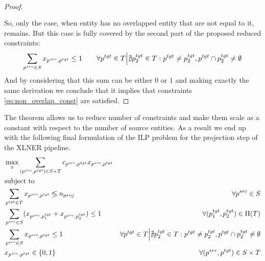 \begin{proof}
\begin{multline*}
\begin{aligned}
        \end{aligned}
    \end{multline*}
    So, only the case, when entity has no overlapped entity that are
    not equal to it, remains. But this case is fully covered by the second part of the proposed reduced constraints:
    \[
        \sum\limits_{p^{src} \in S} x_{p^{src}, p^{tgt}} \leq 1 \qquad
        \forall p^{tgt} \in T \Big| \nexists p_2^{tgt} \in T: p^{tgt} \neq p_2^{tgt}, p^{tgt} \cap p_2^{tgt} \neq \emptyset
    \]
    And by considering that this sum can be either \( 0 \) or \( 1 \) and making
    exactly the same derivation we conclude that it implies that
    constraints \eqref{eq:non_overlap_const} are satisfied.
\end{proof}

The theorem allows us to reduce number of constraints and make them scale as a constant
with respect to the number of source entities. As a result we end up with the following final formulation of the ILP problem for the projection step
of the XLNER pipeline.
\begin{equation} \label{eq:ilp}
    \begin{aligned}
         & \max\limits_x \sum\limits_{(p^{src}, p^{tgt}) \in S \times T} c_{p^{src}, p^{tgt}} x_{p^{src}, p^{tgt}}                                                                                                                       \\
         & \text{subject to}                                                                                                                                                                                                             \\
         & \sum\limits_{p^{tgt} \in T} x_{p^{src}, p^{tgt}} \lessgtr n_{proj}                                      & \forall p^{src} \in S                                                                                               \\
         & \sum\limits_{p^{src} \in S} (x_{p^{src}, p_1^{tgt}} + x_{p^{src}, p_2^{tgt}}) \leq 1                    & \forall (p_1^{tgt}, p_2^{tgt}) \in \Pi(T)                                                                           \\
         & \sum\limits_{p^{src} \in S} x_{p^{src}, p^{tgt}} \leq 1                                                 & \forall p^{tgt} \in T \Big| \nexists p_2^{tgt} \in T: p^{tgt} \neq p_2^{tgt}, p^{tgt} \cap p_2^{tgt} \neq \emptyset \\
         & x_{p^{src}, p^{tgt}} \in \{ 0, 1 \}                                                                     & \forall (p^{src}, p^{tgt}) \in S \times T
    \end{aligned}
\end{equation}

